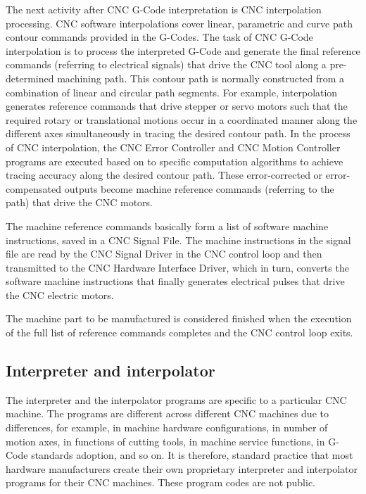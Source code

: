 The next activity after CNC G-Code interpretation is CNC interpolation processing. CNC software interpolations cover linear, parametric and curve path contour commands provided in the G-Codes. The task of CNC G-Code interpolation is to process the interpreted G-Code and generate the final reference commands (referring to electrical signals) that drive the CNC tool along a pre-determined machining path. This contour path is normally constructed from a combination of linear and circular path segments. For example, interpolation generates reference commands that drive stepper or servo motors such that the required rotary or translational motions occur in a coordinated manner along the different axes simultaneously in tracing the desired contour path. In the process of CNC interpolation, the CNC Error Controller and CNC Motion Controller programs are executed based on to specific computation algorithms to achieve tracing accuracy along the desired contour path. These error-corrected or error-compensated outputs become machine reference commands (referring to the path) that drive the CNC motors. 
\vspace*{1\baselineskip}

The machine reference commands basically form a list of software machine instructions, saved in a CNC Signal File. The machine instructions in the signal file are read by the CNC Signal Driver in the CNC control loop and then transmitted to the CNC Hardware Interface Driver, which in turn, converts the software machine instructions that finally generates electrical pulses that drive the CNC electric motors. 

\begin{tcolorbox}[colback=green!15!white,colframe=red!75!black,title=Research consideration no. 1]	
The machine part to be manufactured is considered finished when the execution of the full list of reference commands completes and the CNC control loop exits.
\end{tcolorbox}

\pagebreak
\subsection{Interpreter and interpolator}

The interpreter and the interpolator programs are specific to a particular CNC machine. The programs are different across different CNC machines due to differences, for example, in machine hardware configurations, in number of motion axes, in functions of cutting tools, in machine service functions, in G-Code standards adoption, and so on. It is therefore, standard practice that most hardware manufacturers create their own proprietary interpreter and interpolator programs for their CNC machines. These program codes are not public.

